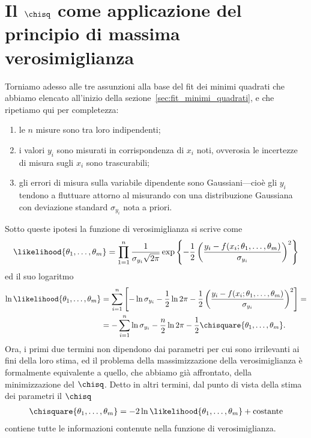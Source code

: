 \section{Il $\chisq$ come applicazione del principio di massima verosimiglianza}

Torniamo adesso alle tre assunzioni alla base del fit dei minimi quadrati che
abbiamo elencato all'inizio della sezione~\ref{sec:fit_minimi_quadrati}, e che
ripetiamo qui per completezza:
\begin{enumerate}
\item le $n$ misure sono tra loro indipendenti;
\item i valori $y_i$ sono misurati in corrispondenza di $x_i$ noti, ovverosia
  le incertezze di misura sugli $x_i$ sono trascurabili;
\item gli errori di misura sulla variabile dipendente sono Gaussiani---cioè
  gli $y_i$ tendono a fluttuare attorno al misurando con una distribuzione
  Gaussiana con deviazione standard $\sigma_{y_i}$ nota a priori.
\end{enumerate}
Sotto queste ipotesi la funzione di verosimiglianza si scrive come
\begin{align*}
  \likelihood{\theta_1,\ldots,\theta_m} =
  \prod_{1 = 1}^n\frac{1}{\sigma_{y_i}\sqrt{2\pi}} \exp \left\{-\frac{1}{2}
  \left(\frac{y_i - f(x_i; \theta_1,\ldots,\theta_m)}{\sigma_{y_i}}\right)^2
  \right\}
\end{align*}
ed il suo logaritmo
\begin{align*}
  \ln\likelihood{\theta_1,\ldots,\theta_m} & =
  \sum_{i = 1}^{n} \left[
    -\ln\sigma_{y_i} - \frac{1}{2}\ln{2\pi} -\frac{1}{2}
    \left(\frac{y_i - f(x_i; \theta_1,\ldots,\theta_m)}{\sigma_{y_i}}\right)^2
    \right] =\\
  & = -\sum_{i = 1}^{n} \ln\sigma_{y_i} -\frac{n}{2} \ln{2\pi} -
  \frac{1}{2} \chisquare{\theta_1,\ldots,\theta_m}.
\end{align*}
Ora, i primi due termini non dipendono dai parametri per cui sono
irrilevanti ai fini della loro stima, ed il problema della massimizzazione della
verosimiglianza è formalmente equivalente a quello, che abbiamo già
affrontato, della minimizzazione del $\chisq$. Detto in altri termini, dal
punto di vista della stima dei parametri il $\chisq$
\begin{align}
  \chisquare{\theta_1,\ldots,\theta_m} =
  -2 \ln\likelihood{\theta_1,\ldots,\theta_m} + \text{costante}
\end{align}
contiene tutte le informazioni contenute nella funzione di verosimiglianza.

